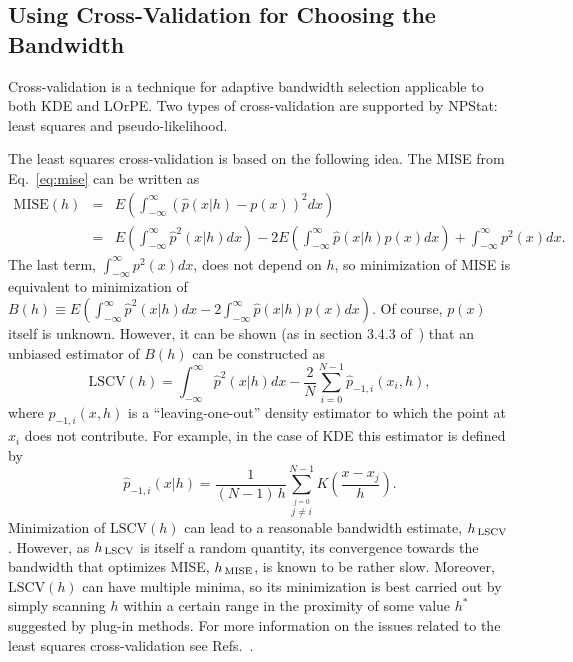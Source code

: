\documentclass[12pt,titlepage]{article}
\newcommand{\sub}[1]{\ensuremath{_{\mbox{\scriptsize \,#1}}}}
\begin{document}
\subsection {Using Cross-Validation for Choosing the Bandwidth}
\label{sec:crossval}

Cross-validation is a technique for adaptive bandwidth selection
applicable to both KDE and LOrPE. Two types of cross-validation
are supported by NPStat: least squares and pseudo-likelihood.

The least squares cross-validation is based on the following idea.
The MISE from Eq.~\ref{eq:mise} can be written as
\begin{eqnarray*}
\mbox{MISE}(h) & = & E \left( \int_{-\infty}^{\infty} (\hat{p}(x|h) - p(x))^2 dx \right) \\ & = & E \left( \int_{-\infty}^{\infty} \hat{p}^2(x|h) dx \right) - 2 E \left( \int_{-\infty}^{\infty} \hat{p}(x|h) p(x) dx \right) + 
\int_{-\infty}^{\infty} p^2(x) dx.
\label{eq:lsqcv}
\end{eqnarray*}
The last term, $\int_{-\infty}^{\infty} p^2(x) dx$, does not depend on $h$,
so minimization of MISE is equivalent to minimization of $B(h) \equiv E \left( \int_{-\infty}^{\infty} \hat{p}^2(x|h) dx - 2 \int_{-\infty}^{\infty} \hat{p}(x|h) p(x) dx \right).$ Of course, $p(x)$ itself is unknown. However, it can be
shown (as in section 3.4.3 of~\cite{ref:silverman})
that an unbiased estimator of $B(h)$ can be constructed as
\begin{equation}
\mbox{LSCV}(h) = \int_{-\infty}^{\infty} \hat{p}^2(x|h) dx - \frac{2}{N} \sum_{i=0}^{N-1} \hat{p}_{-1,i}(x_i, h),
\label{eq:lscv}
\end{equation}
where $\hat{p}_{-1,i}(x, h)$ is a ``leaving-one-out'' density estimator
to which the point at $x_i$ does not contribute. For example, in the
case of KDE this estimator is defined by
\begin{equation}
\hat{p}_{-1,i}(x|h) = \frac{1}{(N-1) \, h} \sum_{\stackrel{j=0}{j \ne i}}^{N-1} K \left(\frac{x - x_j}{h}\right).
\end{equation}
Minimization of $\mbox{LSCV}(h)$ can lead to a reasonable bandwidth estimate,
$h\sub{LSCV}$. However, as $h\sub{LSCV}$ is itself a random quantity,
its convergence towards the bandwidth that optimizes MISE, $h\sub{MISE}$,
is known to be rather slow. Moreover, $\mbox{LSCV}(h)$ can have
multiple minima, so its minimization is best carried out by simply
scanning $h$ within a certain range in the proximity of some value
$h^{*}$ suggested by plug-in methods. For more information on the
issues related to the least squares cross-validation see
Refs.~\cite{ref:silverman, ref:kernsmooth}.
\end{document}

